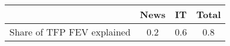\begin{small}
	\begin{tabular}{lccc}
	\hline
		& News & IT & Total \\
		\hline
		Share of TFP FEV explained & 0.2 & 0.6 & 0.8 \\
		\hline
	\end{tabular}
\end{small}
